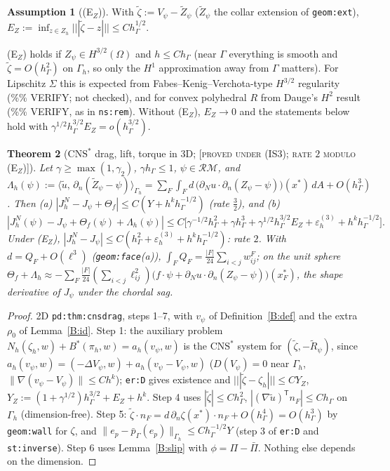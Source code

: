 \documentclass[11pt,reqno]{amsart}
\theoremstyle{plain}
\newtheorem{theorem}{Theorem}[section]
\theoremstyle{definition}
\newtheorem{assumption}[theorem]{Assumption}
\newcommand{\status}[1]{\textup{\textsc{[#1]}}}
\newcommand{\hG}{h_\Gamma}
\newcommand{\Gh}{\Gamma_h}
\newcommand{\Zh}{Z_h}
\newcommand{\dn}{\partial_n}
\newcommand{\ut}{\tilde u}
\newcommand{\pbG}{\bar p_{\Gamma}}
\newcommand{\ip}[2]{\langle #1,\, #2\rangle}
\newcommand{\tnorm}[1]{|\!|\!|#1|\!|\!|}
\newcommand{\norm}[1]{\lVert #1\rVert}
\newcommand{\CNS}{\mathrm{CNS}^\ast}
\newcommand{\epsd}{\varepsilon_h^{(3)}}
\newcommand{\RM}{\mathcal{RM}}
\begin{document}
\begin{assumption}[(E$_Z$)]\label{B:EZ}
With $\tilde\zeta:=V_\psi-\tilde Z_\psi$ ($\tilde Z_\psi$ the collar extension of \texttt{geom:ext}), $E_Z:=\inf_{z\in\Zh}\tnorm{\tilde\zeta-z}\le C\hG^{1/2}$.
\end{assumption}
(E$_Z$) holds if $Z_\psi\in H^{3/2}(\Omega)$ and $h\le C\hG$ (near $\Gamma$ everything is smooth and $\tilde\zeta=O(\hG^2)$ on $\Gh$, so only the $H^1$ approximation away from $\Gamma$ matters). For Lipschitz $\Sigma$ this is expected from Fabes--Kenig--Verchota-type $H^{3/2}$ regularity (\%\% VERIFY; not checked), and for convex polyhedral $R$ from Dauge's $H^2$ result (\%\% VERIFY, as in \texttt{ns:rem}). Without (E$_Z$), $E_Z\to0$ and the statements below hold with $\gamma^{1/2}\hG^{3/2}E_Z=o(\hG^{3/2})$.

\begin{theorem}[$\CNS$ drag, lift, torque in 3D; \status{proved under (IS3); rate $2$ modulo (E$_Z$)}]\label{B:cns}
Let $\gamma\ge\max(1,\gamma_2)$, $\gamma\hG\le1$, $\psi\in\RM$, and $\Lambda_h(\psi):=\ip\ut{\dn(\tilde Z_\psi-\psi)}_{\Gh}=\sum_F\int_Fd\,\bigl(\partial_Nu\cdot\dn(Z_\psi-\psi)\bigr)(x^\ast)\,dA+O(\hG^3)$. Then (a) $|J^N_h-J_\psi+\Theta_f|\le C(Y+h^k\hG^{-1/2})$ (rate $\frac32$), and (b)
\[
|J^N_h(\psi)-J_\psi+\Theta_f(\psi)+\Lambda_h(\psi)|\le C\bigl[\gamma^{-1/2}\hG^2+\gamma\hG^3+\gamma^{1/2}\hG^{3/2}E_Z+\epsd+h^k\hG^{-1/2}\bigr].
\]
Under (E$_Z$), $|J^N_h-J_\psi|\le C(\hG^2+\epsd+h^k\hG^{-1/2})$: rate $2$. With $d=Q_F+O(\ell^3)$ (\texttt{geom:face}(a)), $\int_FQ_F=\frac{|F|}{24}\sum_{i<j}w^F_{ij}$; on the unit sphere $\Theta_f+\Lambda_h\approx-\sum_F\frac{|F|}{24}(\sum_{i<j}\ell_{ij}^2)\bigl(f\cdot\psi+\partial_Nu\cdot\dn(Z_\psi-\psi)\bigr)(x^\ast_F)$, the shape derivative of $J_\psi$ under the chordal sag.
\end{theorem}
\begin{proof}
2D \texttt{pd:thm:cnsdrag}, steps 1--7, with $v_\psi$ of Definition~\ref{B:def} and the extra $\rho_0$ of Lemma~\ref{B:id}. Step 1: the auxiliary problem $N_h(\zeta_h,w)+B^\ast(\pi_h,w)=a_h(v_\psi,w)$ is the $\CNS$ system for $(\tilde\zeta,-\tilde R_\psi)$, since $a_h(v_\psi,w)=(-\Delta V_\psi,w)+a_h(v_\psi-V_\psi,w)$ ($D(V_\psi)=0$ near $\Gh$, $\norm{\nabla(v_\psi-V_\psi)}\le Ch^k$); \texttt{er:D} gives existence and $\tnorm{\tilde\zeta-\zeta_h}\le CY_Z$, $Y_Z:=(1+\gamma^{1/2})\hG^{3/2}+E_Z+h^k$. Step 4 uses $|\tilde\zeta|\le C\hG^2$, $|(\nabla\ut)^{\mathsf T}n_F|\le C\hG$ on $\Gh$ (dimension-free). Step 5: $\tilde\zeta\cdot n_F=d\,\dn\zeta(x^\ast)\cdot n_F+O(\hG^4)=O(\hG^3)$ by \texttt{geom:wall} for $\zeta$, and $\norm{e_p-\pbG(e_p)}_{\Gh}\le C\hG^{-1/2}Y$ (step 3 of \texttt{er:D} and \texttt{st:inverse}). Step 6 uses Lemma~\ref{B:slip} with $\phi=\Pi-\bar\Pi$. Nothing else depends on the dimension.
\end{proof}
\end{document}
